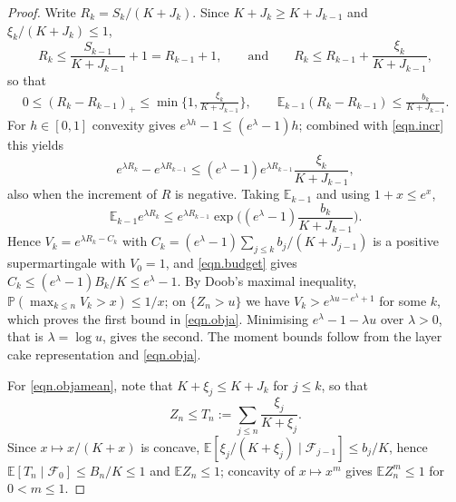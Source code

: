 \documentclass[12pt,oneside,reqno,fleqn]{amsart}
\numberwithin{equation}{section}
\theoremstyle{remark}
\newcommand\cff{{\mathcal F}}
\newcommand\mE{{\mathbb E}}
\newcommand\E{\mE}
\newcommand\PP{{\mathbb P}}
\newcommand{\1}{{\mathbf 1}}
\renewcommand{\le}{\leq}
\renewcommand{\ge}{\geq}
\begin{document}
	\begin{proof}
		Write $R_k=S_k/(K+J_k)$. Since $K+J_k\ge K+J_{k-1}$ and $\xi_k/(K+J_k)\le1$,
		\[
			R_k\le\frac{S_{k-1}}{K+J_{k-1}}+1=R_{k-1}+1,
			\qquad\text{and}\qquad
			R_k\le R_{k-1}+\frac{\xi_k}{K+J_{k-1}},
		\]
		so that
		\begin{align}\label{eqn.incr}
			0\le(R_k-R_{k-1})_+\le\min\Big\{1,\frac{\xi_k}{K+J_{k-1}}\Big\},
			\qquad
			\E_{k-1}(R_k-R_{k-1})\le\frac{b_k}{K+J_{k-1}} .
		\end{align}
		For $h\in[0,1]$ convexity gives $e^{\lambda h}-1\le(e^\lambda-1)h$; combined with \eqref{eqn.incr} this yields
		\[
			e^{\lambda R_k}-e^{\lambda R_{k-1}}\le(e^\lambda-1)e^{\lambda R_{k-1}}\frac{\xi_k}{K+J_{k-1}},
		\]
		also when the increment of $R$ is negative. Taking $\E_{k-1}$ and using $1+x\le e^x$,
		\[
			\E_{k-1}e^{\lambda R_k}\le e^{\lambda R_{k-1}}\exp\Big((e^\lambda-1)\frac{b_k}{K+J_{k-1}}\Big).
		\]
		Hence $V_k=e^{\lambda R_k-C_k}$ with $C_k=(e^\lambda-1)\sum_{j\le k}b_j/(K+J_{j-1})$ is a positive supermartingale with $V_0=1$, and \eqref{eqn.budget} gives $C_k\le(e^\lambda-1)B_k/K\le e^\lambda-1$. By Doob's maximal inequality, $\PP(\max_{k\le n}V_k>x)\le1/x$; on $\{Z_n>u\}$ we have $V_k>e^{\lambda u-e^\lambda+1}$ for some $k$, which proves the first bound in \eqref{eqn.obja}. Minimising $e^\lambda-1-\lambda u$ over $\lambda>0$, that is $\lambda=\log u$, gives the second. The moment bounds follow from the layer cake representation and \eqref{eqn.obja}.

		For \eqref{eqn.objamean}, note that $K+\xi_j\le K+J_k$ for $j\le k$, so that
		\[
			Z_n\le T_n:=\sum_{j\le n}\frac{\xi_j}{K+\xi_j}.
		\]
		Since $x\mapsto x/(K+x)$ is concave, $\E[\xi_j/(K+\xi_j)\mid\cff_{j-1}]\le b_j/K$, hence $\E[T_n\mid\cff_0]\le B_n/K\le1$ and $\E Z_n\le1$; concavity of $x\mapsto x^m$ gives $\E Z_n^m\le1$ for $0<m\le1$.


\end{proof}
\end{document}
